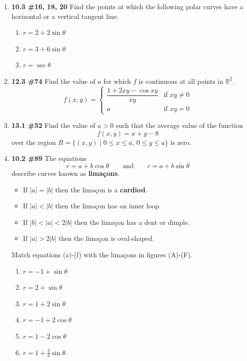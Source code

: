 \documentclass[%
]{article}
\begin{document}
\begin{enumerate}
\item {\bf 10.3 \#16, 18, 20}
Find the points at which the following polar curves have a horizontal or a vertical tangent line.
\begin{enumerate}
\item $r=2+2\sin{\theta}$
\item $r=3+6\sin{\theta}$
\item $r=\sec{\theta}$
\end{enumerate}

\item {\bf 12.3 \#74}
Find the value of $a$ for which $f$ is continuous at all points in $\mathbb R^2$.
\[
f(x,y)=\begin{cases} \dfrac{1+2xy-\cos{xy}}{xy} & \text{if }xy\neq 0 \\
	a & \text{if }xy=0
	\end{cases}
\]

\item {\bf 13.1 \#52}
Find the value of $a>0$ such that the average value of the function
\[
f(x,y)=x+y-8
\]
over the region $R=\{(x,y)\mid 0\leq x\leq a,\,0\leq y\leq a\}$ is zero.

\newpage
\item {\bf 10.2 \#89}
The equations
\[
r=a+b\cos{\theta}\qquad\text{and}\qquad r=a+b\sin{\theta}
\]
describe curves known as \textbf{lima\c cons}.
\begin{itemize}
\item If $|a|=|b|$ then the lima\c con is a \textbf{cardiod}.
\item If $|a|<|b|$ then the lima\c con has an inner loop. 
\item If $|b|<|a|<2|b|$ then the lima\c con has a dent or dimple.
\item If $|a|>2|b|$ then the lima\c con is oval-shaped.
\end{itemize}
Match equations (a)-(f) with the lima\c cons in figures (A)-(F).
\begin{enumerate}
\item $r=-1+\sin{\theta}$
\item $r=2+\sin{\theta}$
\item $r=1+2\sin{\theta}$
\item $r=-1+2\cos{\theta}$
\item $r=1-2\cos{\theta}$
\item $r=1+\frac{2}{3}\sin{\theta}$
\end{enumerate}


\end{enumerate}
\end{document}
